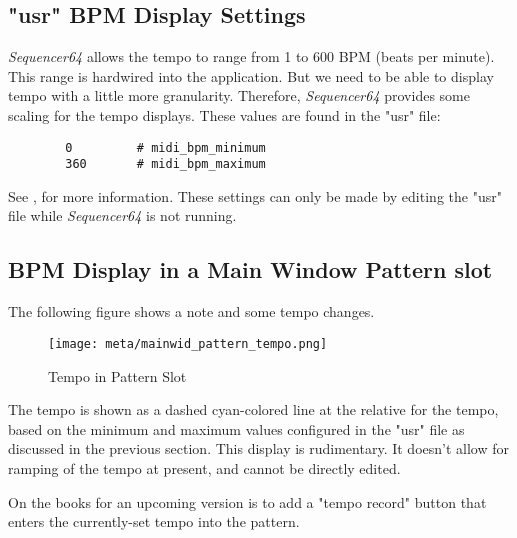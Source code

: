 \subsection{"usr" BPM Display Settings}
\label{subsec:meta_events_usr}

   \textsl{Sequencer64} allows the tempo to range from 1 to 600 BPM
   (beats per minute).    This range is hardwired into the application.
   But we need to be able to display tempo with a little more granularity.
   Therefore, \textsl{Sequencer64} provides some scaling for the tempo
   displays.  These values are found in the "usr" file:

   \begin{verbatim}
		0         # midi_bpm_minimum
		360       # midi_bpm_maximum
   \end{verbatim}

   See , for more
   information.  These settings can only be made by editing the "usr" file
   while \textsl{Sequencer64} is not running.

\subsection{BPM Display in a Main Window Pattern slot}
\label{subsec:meta_events_mainwid_slot}

The following figure shows a note and some tempo changes.

\begin{figure}[H]
   \centering 
   \texttt{[image: meta/mainwid\_pattern\_tempo.png]}
   \caption{Tempo in Pattern Slot}
   \label{fig:meta_events_mainwid_slot}
\end{figure}

The tempo is shown as a dashed cyan-colored line at the relative for the tempo,
based on the minimum and maximum values configured in the "usr" file as
discussed in the previous section.
This display is rudimentary.  It doesn't allow for ramping of the tempo at
present, and cannot be directly edited.

On the books for an upcoming version is to add a "tempo record" button that
enters the currently-set tempo into the pattern.



